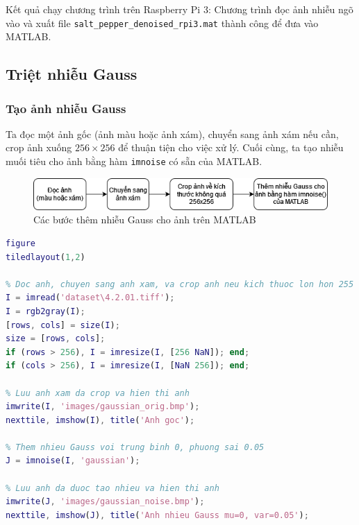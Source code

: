Kết quả chạy chương trình trên Raspberry Pi 3: 
Chương trình đọc ảnh nhiễu ngõ vào và xuất file \verb|salt_pepper_denoised_rpi3.mat| thành công để đưa vào MATLAB.


\subsection{Triệt nhiễu Gauss}

\subsubsection{Tạo ảnh nhiễu Gauss}

Ta đọc một ảnh gốc (ảnh màu hoặc ảnh xám), chuyển sang ảnh xám nếu cần, crop ảnh xuống $256 \times 256$ để thuận tiện cho việc xử lý. Cuối cùng, ta tạo nhiễu muối tiêu cho ảnh bằng hàm \texttt{imnoise} có sẵn của MATLAB.

\begin{figure}[H]
    \centering
    \includegraphics[width=1\linewidth]{images/gaussian_gen_noise.png}
    \caption{Các bước thêm nhiễu Gauss cho ảnh trên MATLAB}
    \label{fig:gaussian_gen_noise}
\end{figure}

\begin{lstlisting}[language=MATLAB]
figure
tiledlayout(1,2)

% Doc anh, chuyen sang anh xam, va crop anh neu kich thuoc lon hon 255
I = imread('dataset\4.2.01.tiff');
I = rgb2gray(I);
[rows, cols] = size(I);
size = [rows, cols];
if (rows > 256), I = imresize(I, [256 NaN]); end;
if (cols > 256), I = imresize(I, [NaN 256]); end;

% Luu anh xam da crop va hien thi anh
imwrite(I, 'images/gaussian_orig.bmp');
nexttile, imshow(I), title('Anh goc');

% Them nhieu Gauss voi trung binh 0, phuong sai 0.05
J = imnoise(I, 'gaussian');

% Luu anh da duoc tao nhieu va hien thi anh
imwrite(J, 'images/gaussian_noise.bmp');
nexttile, imshow(J), title('Anh nhieu Gauss mu=0, var=0.05');
\end{lstlisting}

